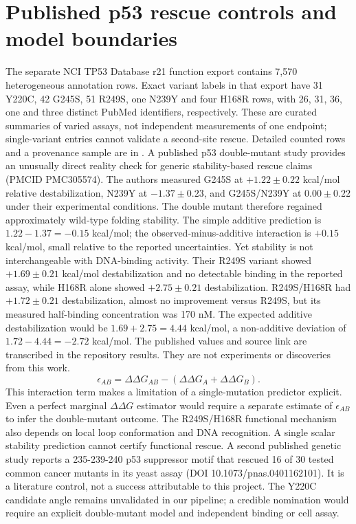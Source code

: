 \documentclass[11pt]{article}
\begin{document}
\section{Published p53 rescue controls and model boundaries}
The separate NCI TP53 Database r21 function export contains 7,570 heterogeneous annotation rows. Exact variant labels in that export have 31 Y220C, 42 G245S, 51 R249S, one N239Y and four H168R rows, with 26, 31, 36, one and three distinct PubMed identifiers, respectively. These are curated summaries of varied assays, not independent measurements of one endpoint; single-variant entries cannot validate a second-site rescue. Detailed counted rows and a provenance sample are in . A published p53 double-mutant study provides an unusually direct reality check for generic stability-based rescue claims (PMCID PMC305574). The authors measured G245S at $+1.22\pm0.22$ kcal/mol relative destabilization, N239Y at $-1.37\pm0.23$, and G245S/N239Y at $0.00\pm0.22$ under their experimental conditions. The double mutant therefore regained approximately wild-type folding stability. The simple additive prediction is $1.22-1.37=-0.15$ kcal/mol; the observed-minus-additive interaction is $+0.15$ kcal/mol, small relative to the reported uncertainties. Yet stability is not interchangeable with DNA-binding activity. Their R249S variant showed $+1.69\pm0.21$ kcal/mol destabilization and no detectable binding in the reported assay, while H168R alone showed $+2.75\pm0.21$ destabilization. R249S/H168R had $+1.72\pm0.21$ destabilization, almost no improvement versus R249S, but its measured half-binding concentration was 170 nM. The expected additive destabilization would be $1.69+2.75=4.44$ kcal/mol, a non-additive deviation of $1.72-4.44=-2.72$ kcal/mol. The published values and source link are transcribed in the repository results. They are not experiments or discoveries from this work.
\begin{equation}\epsilon_{AB}=\Delta\Delta G_{AB}-(\Delta\Delta G_A+\Delta\Delta G_B).\end{equation}
This interaction term makes a limitation of a single-mutation predictor explicit. Even a perfect marginal $\Delta\Delta G$ estimator would require a separate estimate of $\epsilon_{AB}$ to infer the double-mutant outcome. The R249S/H168R functional mechanism also depends on local loop conformation and DNA recognition. A single scalar stability prediction cannot certify functional rescue. A second published genetic study reports a 235-239-240 p53 suppressor motif that rescued 16 of 30 tested common cancer mutants in its yeast assay (DOI 10.1073/pnas.0401162101). It is a literature control, not a success attributable to this project. The Y220C candidate angle remains unvalidated in our pipeline; a credible nomination would require an explicit double-mutant model and independent binding or cell assay.
\end{document}
